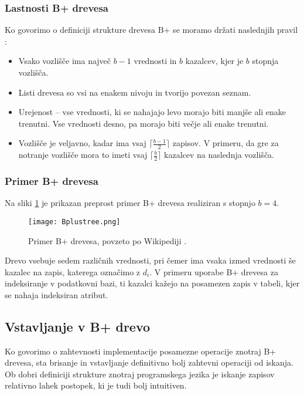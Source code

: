 \documentclass[a4paper,12pt,openright]{book}
\begin{document}
        \subsubsection{Lastnosti B+ drevesa}
        Ko govorimo o definiciji strukture drevesa B+ se moramo držati naslednjih pravil \cite{goodrich2011data}:

        \begin{itemize}
            \item Vsako vozlišče ima največ $b - 1$ vrednosti in $b$ kazalcev, kjer je $b$ stopnja vozlišča.
            \item Listi drevesa so vsi na enakem nivoju in tvorijo povezan seznam.
            \item Urejenost – vse vrednosti, ki se nahajajo levo morajo biti manjše ali enake trenutni. Vse vrednosti desno, pa morajo biti večje ali enake trenutni.
            \item Vozlišče je veljavno, kadar ima vsaj $\lceil \frac{b - 1}{2}\rceil$ zapisov. V primeru, da gre za notranje vozlišče mora to imeti vsaj $\lceil \frac{b}{2} \rceil$ kazalcev na naslednja vozlišča.
        \end{itemize}
        
        \subsubsection{Primer B+ drevesa}
        Na sliki \ref{btree_example} je prikazan preprost primer B+ drevesa realiziran s stopnjo $b=4$.
        
        \begin{figure}[H]        
            \centerline{\texttt{[image: Bplustree.png]}}
            \caption{Primer B+ drevesa, povzeto po Wikipediji \cite{BPTREE}.}
            \label{btree_example}
        \end{figure}

        \noindent
        Drevo vsebuje sedem različnih vrednosti, pri čemer ima vsaka izmed vrednosti še kazalec na zapis, katerega označimo z $d_i$. V primeru uporabe B+ drevesa za indeksiranje v podatkovni bazi, ti kazalci kažejo na posamezen zapis v tabeli, kjer se nahaja indeksiran atribut.

        \subsection{Vstavljanje v B+ drevo}

        Ko govorimo o zahtevnosti implementacije posamezne operacije znotraj B+ drevesa, sta brisanje in vstavljanje definitivno bolj zahtevni operaciji od iskanja. Ob dobri definiciji strukture znotraj programskega jezika je iskanje zapisov relativno lahek postopek, ki je tudi bolj intuitiven.
\end{document}
